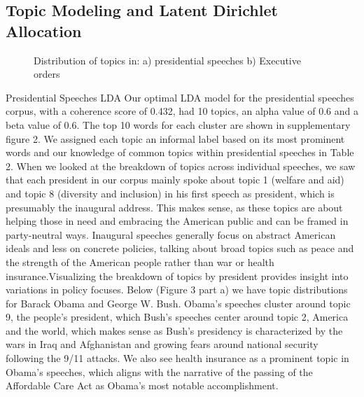 \documentclass{article}
\begin{document}
{\subsection{Topic Modeling and Latent Dirichlet Allocation}{
\begin{figure}[!htb]
	\caption{\label{fig:my-label3} Distribution of topics in: a) presidential speeches b) Executive orders}
\end{figure}
Presidential Speeches LDA
Our optimal LDA model for the presidential speeches corpus, with a coherence score of 0.432, had 10 topics, an alpha value of 0.6 and a beta value of 0.6. The top 10 words for each cluster are shown in supplementary figure 2. 
We assigned each topic an informal label based on its most prominent words and our knowledge of common topics within presidential speeches in Table 2.
When we looked at the breakdown of topics across individual speeches, we saw that each president in our corpus mainly spoke about topic 1 (welfare and aid) and topic 8 (diversity and inclusion) in his first speech as president, which is presumably the inaugural address. This makes sense, as these topics are about helping those in need and embracing the American public and can be framed in party-neutral ways. Inaugural speeches generally focus on abstract American ideals and less on concrete policies, talking about broad topics such as peace and the strength of the American people rather than war or health insurance.Visualizing the breakdown of topics by president provides insight into variations in policy focuses. Below (Figure 3 part a) we have topic distributions for Barack Obama and George W. Bush. Obama’s speeches cluster around topic 9, the people’s president, which Bush’s speeches center around topic 2, America and the world, which makes sense as Bush’s presidency is characterized by the wars in Iraq and Afghanistan and growing fears around national security following the 9/11 attacks. We also see health insurance as a prominent topic in Obama’s speeches, which aligns with the narrative of the passing of the Affordable Care Act as Obama’s most notable accomplishment.  

}}
\end{document}
